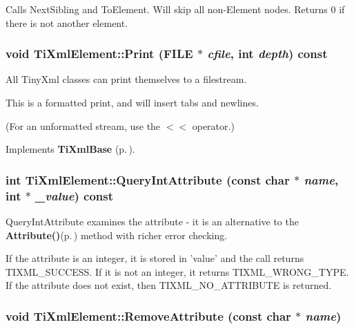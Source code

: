 Calls Next\-Sibling and To\-Element. Will skip all non-Element nodes. Returns 0 if there is not another element.
\subsubsection{\setlength{\rightskip}{0pt plus 5cm}void Ti\-Xml\-Element::Print (FILE $\ast$ {\em cfile}, int {\em depth}) const\hspace{0.3cm}{\tt  [virtual]}}\label{classTiXmlElement_TiXmlElementa29}


All Tiny\-Xml classes can print themselves to a filestream. 

This is a formatted print, and will insert tabs and newlines.

(For an unformatted stream, use the $<$$<$ operator.)

Implements {\bf Ti\-Xml\-Base} {\rm (p.\,\pageref{classTiXmlBase_TiXmlNodea73})}.

\subsubsection{\setlength{\rightskip}{0pt plus 5cm}int Ti\-Xml\-Element::Query\-Int\-Attribute (const char $\ast$ {\em name}, int $\ast$ {\em \_\-value}) const}\label{classTiXmlElement_TiXmlElementa8}


Query\-Int\-Attribute examines the attribute - it is an alternative to the {\bf Attribute()}{\rm (p.\,\pageref{classTiXmlElement_TiXmlElementa5})} method with richer error checking. 

If the attribute is an integer, it is stored in 'value' and the call returns TIXML\_\-SUCCESS. If it is not an integer, it returns TIXML\_\-WRONG\_\-TYPE. If the attribute does not exist, then TIXML\_\-NO\_\-ATTRIBUTE is returned.
\subsubsection{\setlength{\rightskip}{0pt plus 5cm}void Ti\-Xml\-Element::Remove\-Attribute (const char $\ast$ {\em name})}\label{classTiXmlElement_TiXmlElementa21}


